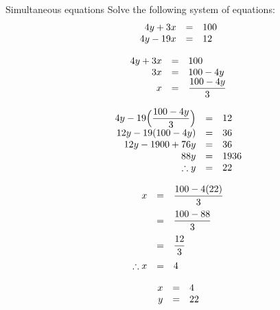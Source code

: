 \begin{wex}
{Simultaneous equations}
{
Solve the following system of equations:
\begin{equation*}
\begin{array}{ccc}\hfill 4y+3x& =& 100\hfill \\ 
\hfill 4y - 19x& =& 12\hfill 
\end{array}
\end{equation*}
}
{
\begin{equation*}
    \begin{array}{ccl}\hfill 4y+3x & =& 100\hfill \\
\hfill 3x &=& 100 - 4y \hfill \\
\hfill x& =& \dfrac{100 - 4y}{3} \hfill
    \end{array}
\end{equation*}


\begin{equation*}
    \begin{array}{ccl}\hfill 4y - 19\Big(\dfrac{100 - 4y}{3}\Big)& =& 12\hfill \\
	\hfill 12y - 19(100 - 4y)  & =& 36\hfill \\
	\hfill 12y - 1900 + 76y & =& 36 \hfill \\
\hfill  88y& =& 1936 \hfill \\
\hfill \therefore y& =& 22 \hfill
    \end{array}
\end{equation*}

\begin{equation*}
    \begin{array}{ccl}\hfill x &=& \dfrac{100 - 4(22)}{3}\hfill \vspace{6pt}\\
	\hfill & =& \dfrac{100-88}{3}\hfill \vspace{6pt}\\
	\hfill & =& \dfrac{12}{3}\hfill\vspace{6pt} \\
	\hfill \therefore x&=& 4 \hfill 
    \end{array}
\end{equation*}


\begin{equation*}
\begin{array}{ccc}
 \hfill x& =& 4\hfill \\
\hfill y& =& 22\hfill 
\end{array}
\end{equation*}
}
\end{wex}

